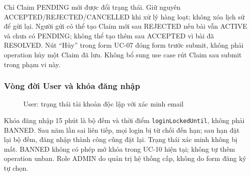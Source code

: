 Chỉ Claim PENDING mới được đổi trạng thái. Giữ nguyên ACCEPTED/REJECTED/CANCELLED khi xử lý hàng loạt; không xóa lịch sử để gửi lại. Người gửi có thể tạo Claim mới sau REJECTED nếu bài vẫn ACTIVE và chưa có PENDING; không thể tạo thêm sau ACCEPTED vì bài đã RESOLVED. Nút ``Hủy'' trong form UC-07 đóng form trước submit, không phải operation hủy một Claim đã lưu. Không bổ sung use case rút Claim sau submit trong phạm vi này.

\subsubsection{Vòng đời User và khóa đăng nhập}
\begin{figure}[H]
\centering
{}
\caption{\bodyfont User: trạng thái tài khoản độc lập với xác minh email}
\label{fig:state-user}
\end{figure}

Khóa đăng nhập 15 phút là bộ đếm và thời điểm \texttt{loginLockedUntil}, không phải BANNED. Sau năm lần sai liên tiếp, mọi login bị từ chối đến hạn; sau hạn đặt lại bộ đếm, đăng nhập thành công cũng đặt lại. Trạng thái xác minh không bị mất. BANNED không có phép mở khóa trong UC-10 hiện tại; không tự thêm operation unban. Role ADMIN do quản trị hệ thống cấp, không do form đăng ký tự chọn.

